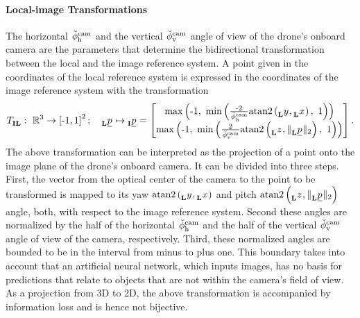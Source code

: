 \paragraph*{Local-image Transformations} $\ $\\
The horizontal
$\ang[\user]{\camera}{\text h}{}{}$
and the vertical
$\ang[\user]{\camera}{\text v}{}{}$
angle of view
of the drone's onboard camera
are the parameters 
that determine the bidirectional transformation 
between the local and the image reference system.
A point given in the coordinates of the local reference system
is expressed in the coordinates of the image reference system with the transformation
\begin{align} \label{equ:local_to_image_transformation}
    \trafo[]{}{\irs\lrs}{}{}
    :\ 
    \mathbb{R}^3 \rightarrow \left[ \text{-}1, 1 \right]^2
    ; \quad
    \pos[]{}{}{\lrs}{} \mapsto \pos[]{}{}{\irs}{}
    =
    \begin{bmatrix}
        \maxof{\text -1}{
            \minof{
                \frac{\text -2}{\ang[\user]{\camera}{\text h}{}{}}
                \mathrm{atan2}\left( \y[]{}{}{\lrs}{}, \x[]{}{}{\lrs}{} \right)
            }{1}
        }
        \\
        \maxof{\text -1}{
            \minof{
                \frac{2}{\ang[\user]{\camera}{\text v}{}{}}
            \mathrm{atan2} \left( \z[]{}{}{\lrs}{}, \| \pos[]{}{}{\lrs}{} \|_2 \right)
            }{1}
        }
    \end{bmatrix}
    .
\end{align}
The above transformation
can be interpreted as the projection of a point onto the image plane 
of the drone's onboard camera.
It can be divided into three steps.
First, the vector from the optical center of the camera 
to the point to be transformed
is mapped to its yaw
$\mathrm{atan2}\left( \y[]{}{}{\lrs}{}, \x[]{}{}{\lrs}{} \right)$
and pitch 
$\mathrm{atan2} \left( \z[]{}{}{\lrs}{}, \| \pos[]{}{}{\lrs}{} \|_2 \right)$
angle, both, with respect to the image reference system.
Second these angles are normalized by 
the half of the horizontal 
$\ang[\user]{\camera}{\text h}{}{}$ 
and the half of the vertical
$\ang[\user]{\camera}{\text v}{}{}$
angle of view of the camera, respectively.
Third, these normalized angles are bounded to be in the interval from minus to plus one.
This boundary takes into account 
that an artificial neural network, which inputs images, 
has no basis for predictions 
that relate to objects that are not within the camera's field of view.
As a projection from 3D to 2D, the above transformation is accompanied by information loss
and is hence not bijective.

